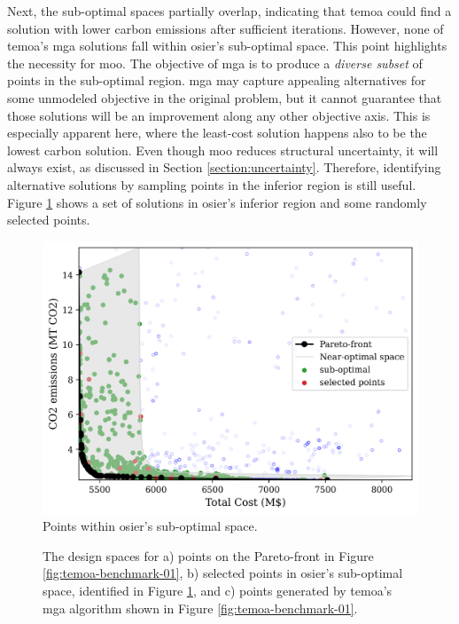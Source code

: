 Next, the sub-optimal spaces partially overlap, indicating that \ac{temoa} could
find a solution with lower carbon emissions after sufficient iterations.
However, none of \ac{temoa}'s \ac{mga} solutions fall within \ac{osier}'s
sub-optimal space. This point highlights the necessity for \acl{moo}. The
objective of \ac{mga} is to produce a \textit{diverse subset} of points in the
sub-optimal region. \ac{mga} may capture appealing alternatives for some
unmodeled objective in the original problem, but it cannot guarantee that those
solutions will be an improvement along any other objective axis. This is
especially apparent here, where the least-cost solution happens also to be the
lowest carbon solution. Even though \ac{moo} reduces structural uncertainty, it
will always exist, as discussed in Section \ref{section:uncertainty}. Therefore,
identifying alternative solutions by sampling points in the inferior region is
still useful. Figure \ref{fig:temoa-benchmark-02} shows a set of solutions in
\ac{osier}'s inferior region and some randomly selected points.



\begin{figure}[h]
  \centering
  \includegraphics[width=0.6\columnwidth]{figures/results/osier_mga_subset_01.png}
  \caption{Points within \ac{osier}'s sub-optimal space.}
  \label{fig:temoa-benchmark-02}
\end{figure}


\begin{figure}[h]
  \centering
  \resizebox{\columnwidth}{!}{}
  \caption{The design spaces for a) points on the Pareto-front in Figure
  \ref{fig:temoa-benchmark-01}, b) selected points in \ac{osier}'s sub-optimal
  space, identified in Figure \ref{fig:temoa-benchmark-02}, and c) points
  generated by \ac{temoa}'s \ac{mga} algorithm shown in Figure
  \ref{fig:temoa-benchmark-01}.}
  \label{fig:temoa-benchmark-03}
\end{figure}


